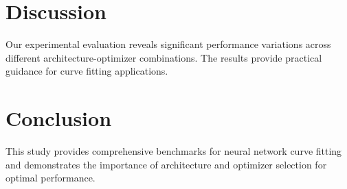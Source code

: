 \documentclass[11pt,letterpaper]{article}
\begin{document}
\section{Discussion}

Our experimental evaluation reveals significant performance variations across different architecture-optimizer combinations. The results provide practical guidance for curve fitting applications.

\section{Conclusion}

This study provides comprehensive benchmarks for neural network curve fitting and demonstrates the importance of architecture and optimizer selection for optimal performance.
\end{document}
